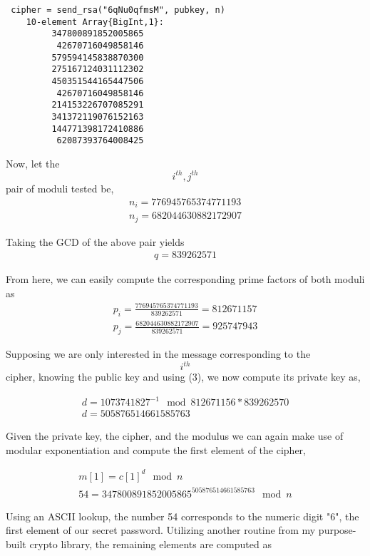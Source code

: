 \documentclass[conference]{/Users/paul/MSEE/ee595/project/report/IEEEtran/IEEEtran}
\begin{document}
\begin{verbatim}
 cipher = send_rsa("6qNu0qfmsM", pubkey, n)
    10-element Array{BigInt,1}:
         347800891852005865
          42670716049858146
         579594145838870300
         275167124031112302
         450351544165447506
          42670716049858146
         214153226707085291
         341372119076152163
         144771398172410886
          62087393764008425
\end{verbatim}
 
Now, let the $$i^{th}, j^{th}$$ pair of moduli tested be, 
\begin{align}
    n_i = 776945765374771193\\
    n_j = 682044630882172907
\end{align}
 
Taking the GCD of the above pair yields
\begin{align}
    q = 839262571
\end{align}

From here, we can easily compute the corresponding prime factors of both moduli as
\begin{align}
    p_i = \frac{776945765374771193}{839262571} = 812671157 \\
    p_j = \frac{682044630882172907}{839262571} = 925747943
\end{align}
 
Supposing we are only interested in the message corresponding to the $$i^{th}$$ cipher, knowing the public key and using (3), we now compute its private key as, 
 
\begin{align}
    d = 1073741827^{-1} \mod 812671156 * 839262570\\
    d = 505876514661585763
\end{align}
 
Given the private key, the cipher, and the modulus we can again make use of modular exponentiation and compute the first element of the cipher, 

\begin{align}
    m[1] = c[1]^d \mod n \\
    54 = 347800891852005865^{505876514661585763} \mod n 
\end{align}
 
Using an ASCII lookup, the number 54 corresponds to the numeric digit "6", the first element of our secret password. Utilizing another routine from my purpose-built crypto library, the remaining elements are computed as  
 
\end{document}
